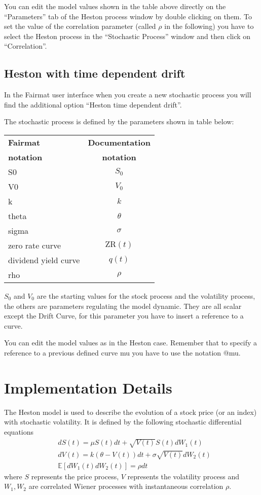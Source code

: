 You can edit the model values shown in the table above directly on the ``Parameters'' tab of the Heston process window by double clicking on them. To set the value of the correlation parameter (called $\rho$ in the following) you have to select the Heston process in the ``Stochastic Process'' window and then click on ``Correlation''.

\subsection{Heston with time dependent drift}

In the Fairmat user interface when you create a new stochastic process you will find the additional option ``Heston time dependent drift''.

The stochastic process is defined by the parameters shown in table below:
\begin{center}
\begin{tabular}{|l|c|}
  \hline
\textbf{Fairmat}&\textbf{Documentation}\\
\textbf{notation}&\textbf{notation}\\
                     \hline
 S0     & $S_0$\\
 V0     & $V_0$\\
 k      & $k$ \\
 theta  & $\theta$\\
 sigma  & $\sigma$\\
 zero rate curve    & $\mathrm{ZR}(t)$\\
 dividend yield curve    & $q(t)$\\
rho & $\rho$ \\ 
   \hline
\end{tabular}
\end{center}
$S_0$ and $V_0$ are the starting values for the stock process and the volatility process, the others are parameters regulating the model dynamic. They are all scalar except the Drift Curve, for this parameter you have to insert a reference to a curve.

You can edit the model values as in the Heston case. Remember that to specify a reference to a previous defined curve {\ttfamily mu} you have to use the notation {\ttfamily @mu}.

\section{Implementation Details}

The Heston model is used to describe the evolution of a stock price (or an index) with stochastic volatility. It is defined by the following stochastic differential equations
\begin{align}
& dS(t) = \mu S(t)dt + \sqrt{V(t)}S(t)dW_1(t)\label{eq:dsh}\\
& dV(t) = k(\theta - V(t))dt + \sigma\sqrt{V(t)}dW_2(t)\\
& \mathbb{E}[dW_1(t)dW_2(t)] = \rho dt
\end{align}
where $S$ represents the price process, $V$ represents the volatility process and $W_1, W_2$ are correlated Wiener processes with instantaneous correlation $\rho$.


